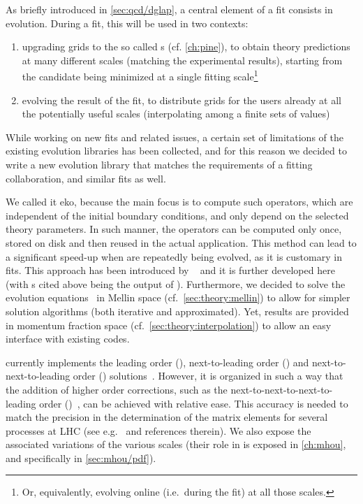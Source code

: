 
As briefly introduced in \cref{sec:qcd/dglap}, a central element of a \pdf fit
consists in \dglap evolution.
%
During a fit, this will be used in two contexts: 
\begin{enumerate}[label=\roman*.]
  \item upgrading grids to the so called \fktab{}s (cf. \cref{ch:pine}), to
    obtain theory predictions at many different scales (matching the
    experimental results), starting from the \pdf candidate being minimized at
    a single fitting scale\footnote{
      Or, equivalently, evolving online (i.e.\ during the fit) at all those scales.
    }
  \item evolving the result of the fit, to distribute \pdf grids for the users
    already at all the potentially useful scales (interpolating among a finite
    sets of values)
\end{enumerate}

While working on new \pdf fits and related issues, a certain set of limitations
of the existing \dglap evolution libraries has been collected, and for this
reason we decided to write a new \qcd{} evolution library that matches the
requirements of a \pdf fitting collaboration, and similar fits as well.

We called it \acrfull{eko}, because the main focus is to compute such
operators, which are independent of the initial boundary conditions, and only
depend on the selected theory parameters.
In such manner, the operators can be computed only once, stored on disk and
then reused in the actual application. This method can lead to a significant
speed-up when \pdfs are repeatedly being evolved, as it is customary in \pdf{}
fits.
This approach has been introduced by
\fk~\cite{Ball:2008by,Ball:2010de,DelDebbio:2007ee} and it is further developed
here (with \fktab{}s cited above being the output of \fk).
%
Furthermore, we decided to solve the evolution equations~ in Mellin space (cf.\
\cref{sec:theory:mellin}) to allow for simpler solution algorithms (both
iterative and approximated).
Yet, results are provided in momentum fraction space (cf.\
\cref{sec:theory:interpolation}) to allow an easy interface with existing
codes.

\eko{} currently implements the leading order (\lo{}),
next-to-leading order (\nlo{}) and next-to-next-to-leading order (\nnlo{})
solutions~\cite{Vogt:2004mw,Moch:2004pa,Blumlein:2021enk}.
However, it is organized in such a way that the addition of higher order corrections,
such as the next-to-next-to-next-to-leading order (\nnnlo{})~\cite{Moch:2021qrk},
can be achieved with relative ease.
This accuracy is needed to match the precision in the determination of the
matrix elements for several processes at LHC (see e.g.\ \cite{Duhr:2021vwj} and
references therein).
We also expose the associated variations of the various scales (their role in
\pdfs is exposed in \cref{ch:mhou}, and specifically in \cref{sec:mhou/pdf}).

